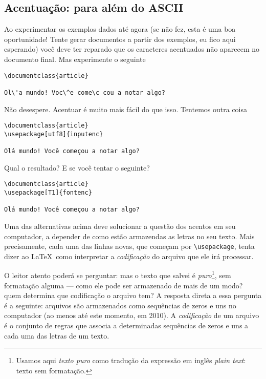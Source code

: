 \subsection{Acentuação: para além do ASCII}\label{subsec:ascii}

Ao experimentar os exemplos dados até agora (se não fez, esta é uma
boa oportunidade! Tente gerar documentos a partir dos exemplos, eu
fico aqui esperando) você deve ter reparado que os caracteres
acentuados não aparecem no documento final. Mas experimente o seguinte
\begin{footnotesize}
\begin{verbatim}
\documentclass{article}

Ol\'a mundo! Voc\^e come\c cou a notar algo?

\end{verbatim}
\end{footnotesize}

Não desespere. Acentuar é muito mais fácil do que isso. Tentemos outra
coisa

\begin{footnotesize}
\begin{verbatim}
\documentclass{article}
\usepackage[utf8]{inputenc}

Olá mundo! Você começou a notar algo?

\end{verbatim}
\end{footnotesize}

Qual o resultado? E se você tentar o seguinte?
\begin{footnotesize}
\begin{verbatim}
\documentclass{article}
\usepackage[T1]{fontenc}

Olá mundo! Você começou a notar algo?

\end{verbatim}
\end{footnotesize}

Uma das alternativas acima deve solucionar a questão dos acentos em
seu computador, a depender de como estão armazendas as letras no
seu texto. Mais precisamente, cada uma das linhas novas, que começam
por \verb'\usepackage', tenta dizer ao \LaTeX\ como interpretar a
\emph{codificação} do arquivo que ele irá processar.

\begin{detalhe}
O leitor atento poderá se perguntar: mas o texto que salvei é
\emph{puro}\footnote{Usamos aqui \emph{texto puro} como tradução da
  expressão em inglês \emph{plain text}: texto sem formatação.}, sem
formatação alguma --- como ele pode ser armazenado de mais de um modo?
quem determina que codificação o arquivo tem? 
A resposta direta a essa pergunta é a seguinte: arquivos são
armazenados como sequências de zeros e uns no computador (ao menos até
este momento, em 2010). A \emph{codificação} de um arquivo é o
conjunto de regras que associa a determinadas sequências de zeros e
uns a cada uma das letras de um texto.
\end{detalhe}

